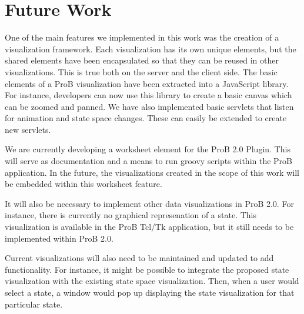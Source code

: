 \section{Future Work}

One of the main features we implemented in this work was the creation of a visualization framework. Each visualization has its own unique elements, but the shared elements have been encapsulated so that they can be reused in other visualizations. This is true both on the server and the client side. The basic elements of a ProB visualization have been extracted into a JavaScript library. For instance, developers can now use this library to create a basic canvas which can be zoomed and panned. We have also implemented basic servlets that listen for animation and state space changes. These can easily be extended to create new servlets.

We are currently developing a worksheet element for the ProB 2.0 Plugin. This will serve as documentation and a means to run groovy scripts within the ProB application. In the future, the visualizations created in the scope of this work will be embedded within this worksheet feature. 

It will also be necessary to implement other data visualizations in ProB 2.0. For instance, there is currently no graphical represenation of a state. This visualization is available in the ProB Tcl/Tk application, but it still needs to be implemented within ProB 2.0.

Current visualizations will also need to be maintained and updated to add functionality. For instance, it might be possible to integrate the proposed state visualization with the existing state space visualization. Then, when a user would select a state, a window would pop up displaying the state visualization for that particular state.